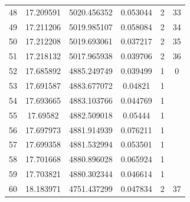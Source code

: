 \documentclass{aa}
\begin{document}
\begin{table}[b]
\begin{tabular}{c|c|c|c|c|c}
48  &  17.209591 &  5020.456352 &  0.053044 &    2  &     33 \\
49  &  17.211206 &  5019.985107 &  0.058084 &    2  &     34 \\
50  &  17.212208 &  5019.693061 &  0.037217 &    2  &     35 \\
51  &  17.218132 &  5017.965938 &  0.039706 &    2  &     36 \\
52  &  17.685892 &  4885.249749 &  0.039499 &    1  &     0 \\
53  &  17.691587 &  4883.677072 &   0.04821 &    1  &         \\
54  &  17.693665 &  4883.103766 &  0.044769 &    1  &         \\
55  &   17.69582 &  4882.509018 &   0.05444 &    1  &         \\
56  &  17.697973 &  4881.914939 &  0.076211 &    1  &         \\
57  &  17.699358 &  4881.532994 &  0.053501 &    1  &         \\
58  &  17.701668 &  4880.896028 &  0.065924 &    1  &         \\
59  &  17.703821 &  4880.302344 &  0.046614 &    1  &         \\
60  &  18.183971 &  4751.437299 &  0.047834 &    2  &     37 \\
    \end{tabular}
\end{table}
\end{document}
